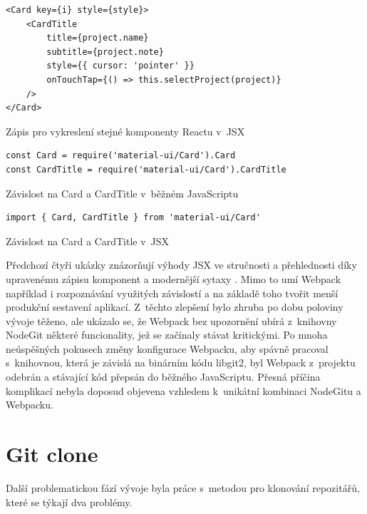 \begin{listing}[ht]
\begin{verbatim}
<Card key={i} style={style}>
	<CardTitle
		title={project.name}
		subtitle={project.note}
		style={{ cursor: 'pointer' }}
		onTouchTap={() => this.selectProject(project)}
	/>
</Card>
\end{verbatim}
\caption[Komponenta v~JSX]{Zápis pro vykreslení stejné komponenty Reactu v~JSX}
\end{listing}

\begin{listing}[ht]
	\begin{verbatim}
const Card = require('material-ui/Card').Card
const CardTitle = require('material-ui/Card').CardTitle
	\end{verbatim}
	\caption[Závislosti v~JavaScriptu]{Závislost na Card a CardTitle v~běžném JavaScriptu}
\end{listing}

\begin{listing}[ht]
	\begin{verbatim}
import { Card, CardTitle } from 'material-ui/Card'
	\end{verbatim}
	\caption[Závislost v~JSX]{Závislost na Card a CardTitle v~JSX}
\end{listing}

\FloatBarrier

Předchozí čtyři ukázky znázorňují výhody JSX ve stručnosti a přehlednosti díky upravenému zápisu komponent a modernější sytaxy . Mimo to umí Webpack například i rozpoznávání využitých závislostí a na základě toho tvořit menší produkční sestavení aplikací. Z~těchto zlepšení bylo zhruba po dobu poloviny vývoje těženo, ale ukázalo se, že Webpack bez upozornění ubírá z~knihovny NodeGit některé funcionality, jež se začínaly stávat kritickými. Po mnoha neúspěšných pokusech změny konfigurace Webpacku, aby spávně pracoval s~knihovnou, která je závislá na binárním kódu libgit2, byl Webpack z~projektu odebrán a stávající kód přepsán do běžného JavaScriptu. Přesná příčina komplikací nebyla doposud objevena vzhledem k~unikátní kombinaci NodeGitu a Webpacku.

\section{Git clone}

Další problematickou fází vývoje byla práce s~metodou pro klonování repozitářů, které se týkají dva problémy.

